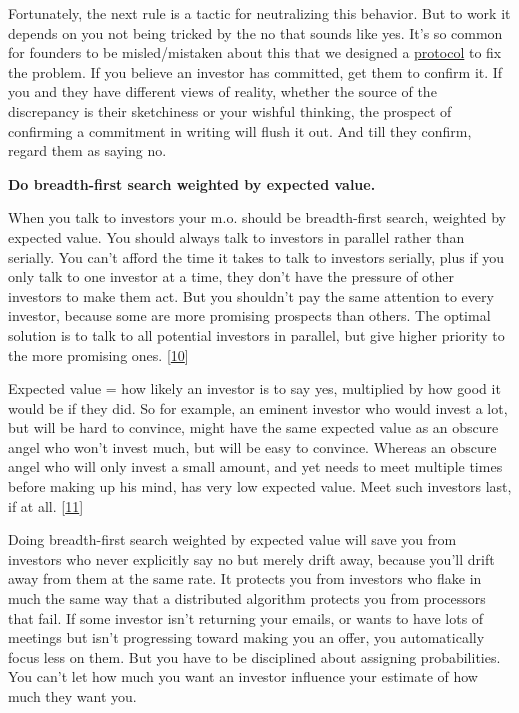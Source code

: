 Fortunately, the next rule is a tactic for neutralizing this behavior.
But to work it depends on you not being tricked by the no that sounds
like yes. It's so common for founders to be misled/mistaken about this
that we designed a \href{http://ycombinator.com/hdp.html}{protocol} to
fix the problem. If you believe an investor has committed, get them to
confirm it. If you and they have different views of reality, whether the
source of the discrepancy is their sketchiness or your wishful thinking,
the prospect of confirming a commitment in writing will flush it out.
And till they confirm, regard them as saying no.

\textbf{Do breadth-first search weighted by expected value.}

When you talk to investors your m.o. should be breadth-first search,
weighted by expected value. You should always talk to investors in
parallel rather than serially. You can't afford the time it takes to
talk to investors serially, plus if you only talk to one investor at a
time, they don't have the pressure of other investors to make them act.
But you shouldn't pay the same attention to every investor, because some
are more promising prospects than others. The optimal solution is to
talk to all potential investors in parallel, but give higher priority to
the more promising ones. {[}\hyperref[f10n]{10}{]}

Expected value = how likely an investor is to say yes, multiplied by how
good it would be if they did. So for example, an eminent investor who
would invest a lot, but will be hard to convince, might have the same
expected value as an obscure angel who won't invest much, but will be
easy to convince. Whereas an obscure angel who will only invest a small
amount, and yet needs to meet multiple times before making up his mind,
has very low expected value. Meet such investors last, if at all.
{[}\hyperref[f11n]{11}{]}

Doing breadth-first search weighted by expected value will save you from
investors who never explicitly say no but merely drift away, because
you'll drift away from them at the same rate. It protects you from
investors who flake in much the same way that a distributed algorithm
protects you from processors that fail. If some investor isn't returning
your emails, or wants to have lots of meetings but isn't progressing
toward making you an offer, you automatically focus less on them. But
you have to be disciplined about assigning probabilities. You can't let
how much you want an investor influence your estimate of how much they
want you.

